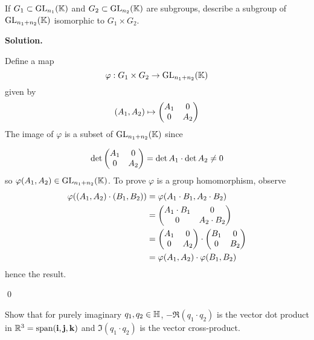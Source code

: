 \documentclass[12pt]{book}
\theoremstyle{definition}
\newenvironment{solution}
{%
  \par\noindent\textbf{Solution.}\quad
}
{%
  \qed\par
}
\begin{document}
\begin{taggedexercise}[\textcolor{green}{Complete}]
  If $G_1 \subset \mathrm{GL}_{n_1}(\mathbb{K})$ and $G_2 \subset \mathrm{GL}_{n_2}(\mathbb{K})$ are subgroups, describe a subgroup of $\mathrm{GL}_{n_1 + n_2}(\mathbb{K})$ isomorphic to $G_1 \times G_2$.
\end{taggedexercise}
\begin{solution}
  Define a map 
  \[
  \varphi : G_1 \times G_2 \to \mathrm{GL}_{n_1 + n_2}(\mathbb{K}) \\
  \]
  given by
  \[
  (A_1, A_2) \mapsto \begin{pmatrix} A_1 & 0 \\ 0 & A_2 \end{pmatrix}
  \]
  The image of $\varphi$ is a subset of $\mathrm{GL}_{n_1 + n_2}(\mathbb{K})$ since

  \[
  \det \begin{pmatrix} A_1 & 0 \\ 0 & A_2 \end{pmatrix} = \det A_1 \cdot \det A_2 \neq 0
  \]
  so $\varphi(A_1, A_2) \in \mathrm{GL}_{n_1 + n_2}(\mathbb{K})$.
  To prove $\varphi$ is a group homomorphism, observe
  \[
  \begin{aligned}
    \varphi((A_1, A_2) \cdot (B_1, B_2)) &= \varphi(A_1 \cdot B_1, A_2 \cdot B_2) \\
                                         &= \begin{pmatrix} A_1 \cdot B_1 & 0 \\ 0 & A_2 \cdot B_2 \end{pmatrix} \\
                                         &= \begin{pmatrix} A_1 & 0 \\ 0 & A_2 \end{pmatrix} \cdot \begin{pmatrix} B_1 & 0 \\ 0 & B_2 \end{pmatrix} \\
                                         &= \varphi(A_1, A_2) \cdot \varphi(B_1, B_2)
  \end{aligned}
  \]    
  hence the result.

\end{solution}

\begin{taggedexercise}[\textcolor{red}{TODO}]
  
\end{taggedexercise}

\begin{taggedexercise}[\textcolor{green}{Complete}]
  Show that for purely imaginary $q_1, q_2 \in \mathbb{H}$, $-\Re (q_1 \cdot q_2)$ is the vector dot product in $\mathbb{R}^3 = \text{span}(\mathbf{i},
  \mathbf{j},\mathbf{k})$ and $\Im(q_1 \cdot q_2)$ is the vector cross-product.
\end{taggedexercise}
\end{document}
